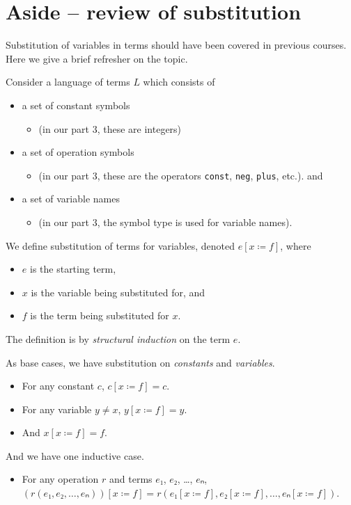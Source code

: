 \documentclass[11pt]{article}
\begin{document}
\section*{Aside – review of substitution}
\label{sec:org8520de3}
Substitution of variables in terms should have been covered
in previous courses. Here we give a brief refresher
on the topic.

Consider a language of terms \(L\) which consists of
\begin{itemize}
\item a set of constant symbols
\begin{itemize}
\item (in our part 3, these are integers)
\end{itemize}
\item a set of operation symbols
\begin{itemize}
\item (in our part 3, these are the operators \texttt{const}, \texttt{neg}, \texttt{plus}, etc.). and
\end{itemize}
\item a set of variable names
\begin{itemize}
\item (in our part 3, the symbol type is used for variable names).
\end{itemize}
\end{itemize}

We define substitution of terms for variables,
denoted \(e[x ≔ f]\), where
\begin{itemize}
\item \(e\) is the starting term,
\item \(x\) is the variable being substituted for, and
\item \(f\) is the term being substituted for \(x\).
\end{itemize}
The definition is by \emph{structural induction} on the term \(e\).

As base cases, we have substitution on \emph{constants} and \emph{variables}.
\begin{itemize}
\item For any constant \(c\), \(c[x ≔ f] = c\).
\item For any variable \(y ≠ x\), \(y[x ≔ f] = y\).
\item And \(x[x ≔ f] = f\).
\end{itemize}

And we have one inductive case.
\begin{itemize}
\item For any operation \(r\) and terms \(e₁\), \(e₂\), …, \(eₙ\),
\((r(e₁,e₂,…,eₙ))[x ≔ f] = r(e₁[x ≔ f], e₂[x ≔ f], …, eₙ[x ≔ f])\).
\end{itemize}
\end{document}
